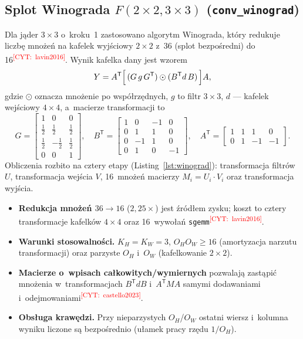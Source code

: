\documentclass[a4paper,12pt]{book} %
\newcommand{\todocite}[1]{\textsuperscript{\textcolor{red}{[CYT:~#1]}}}
\newcommand{\kod}[1]{\texttt{#1}}
\begin{document}
\subsection{Splot Winograda $F(2\times2,3\times3)$ (\kod{conv\_winograd})}
Dla jąder $3\times3$ o~kroku~1 zastosowano algorytm Winograda, który redukuje
liczbę mnożeń na kafelek wyjściowy $2\times2$ z~36 (splot bezpośredni) do
16\todocite{lavin2016}. Wynik kafelka dany jest wzorem
\begin{equation}
Y = A^{\mathsf T}\Bigl[\,(G\,g\,G^{\mathsf T})\odot(B^{\mathsf T} d\,B)\,\Bigr] A,
\label{eq:winograd}
\end{equation}
gdzie $\odot$ oznacza mnożenie po współrzędnych, $g$ to filtr $3\times3$, $d$ ---
kafelek wejściowy $4\times4$, a~macierze transformacji to
\[
G=\begin{bmatrix}1&0&0\\[2pt]\tfrac12&\tfrac12&\tfrac12\\[2pt]\tfrac12&-\tfrac12&\tfrac12\\[2pt]0&0&1\end{bmatrix},\quad
B^{\mathsf T}=\begin{bmatrix}1&0&-1&0\\0&1&1&0\\0&-1&1&0\\0&1&0&-1\end{bmatrix},\quad
A^{\mathsf T}=\begin{bmatrix}1&1&1&0\\0&1&-1&-1\end{bmatrix}.
\]
Obliczenia rozbito na cztery etapy (Listing~\ref{lst:winograd}): transformacja
filtrów $U$, transformacja wejścia $V$, 16~mnożeń macierzy
$M_i=U_i\cdot V_i$ oraz transformacja wyjścia.
\begin{itemize}
\item \textbf{Redukcja mnożeń $36\to16$} ($2,25\times$) jest źródłem zysku;
  koszt to cztery transformacje kafelków $4\times4$ oraz 16~wywołań
  \kod{sgemm}\todocite{lavin2016}.
\item \textbf{Warunki stosowalności.} $K_H=K_W=3$, $O_H O_W \ge 16$ (amortyzacja
  narzutu transformacji) oraz parzyste $O_H$ i~$O_W$ (kafelkowanie $2\times2$).
\item \textbf{Macierze o~wpisach całkowitych/wymiernych} pozwalają zastąpić mnożenia
  w~transformacjach $B^{\mathsf T}dB$ i~$A^{\mathsf T}MA$ samymi dodawaniami
  i~odejmowaniami\todocite{castello2023}.
\item \textbf{Obsługa krawędzi.} Przy nieparzystych $O_H$/$O_W$ ostatni wiersz
  i~kolumna wyniku liczone są bezpośrednio (ułamek pracy rzędu $1/O_H$).
\end{itemize}
\end{document}
